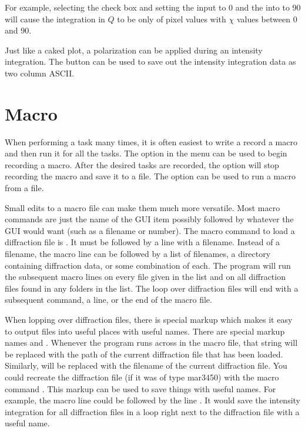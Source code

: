 For example, selecting the 
check box and setting the  input to 0 and the
 into to 90 will cause the integration in $Q$
to be only of pixel values with $\chi$ values between 0 and 90. 

Just like a caked plot, a polarization can be applied during
an intensity integration. The  button can be used
to save out the intensity integration data as two column ASCII. 

\section{Macro}

When performing a task many times, it is often easiest to 
write a record a macro and then run it for all the tasks.
The  option in the  menu
can be used to begin recording a macro. After the desired
tasks are recorded, the  option will
stop recording the macro and save it to a file. The
 option can be used to run a macro from
a file. 

Small edits to a macro file can make them much more versatile. 
Most macro commands are just the name of the GUI item
possibly followed by whatever the GUI would want (such as a 
filename or number). The macro command to load a diffraction 
file is . It must be followed by a line with 
a filename. Instead of a filename, the  macro
line can be followed by a list of filenames,
a directory containing diffraction data, or some combination
of each. The program will run the subsequent macro lines on
every file given in the list and on all diffraction files found 
in any folders in the list. The loop over diffraction
files will end with a subsequent  command,
a  line, or the end of the macro file.

When lopping over diffraction files, there is special 
markup which makes it easy to output files into useful
places with useful names. There are special markup names
 and . Whenever the
program runs across  in the macro file,
that string will be replaced with the path of the current
diffraction file that has been loaded. Similarly, 
 will be replaced with the filename of
the current diffraction file. You could recreate the 
diffraction file (if it was of type mar3450) with the macro 
command .
This markup can be used to save things with useful names. For
example, the macro line 
could be followed by the line
. It would save the intensity
integration for all diffraction files in a loop right next to the
diffraction file with a useful name.
